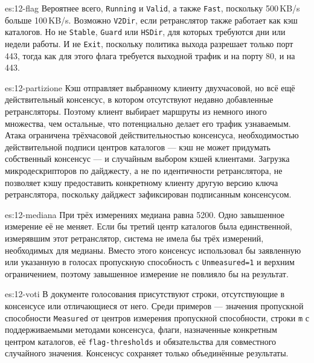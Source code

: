 \begin{soluzione}{es:12-flag}
Вероятнее всего, \texttt{Running} и \texttt{Valid}, а также \texttt{Fast}, поскольку 500\,KB/s больше 100\,KB/s. Возможно \texttt{V2Dir}, если ретранслятор также работает как кэш каталогов. Но не \texttt{Stable}, \texttt{Guard} или \texttt{HSDir}, для которых требуются дни или недели работы. И не \texttt{Exit}, поскольку политика выхода разрешает только порт 443, тогда как для этого флага требуется выходной трафик и на порту 80, и на 443.
\end{soluzione}

\begin{soluzione}{es:12-partizione}
Кэш отправляет выбранному клиенту двухчасовой, но всё ещё действительный консенсус, в котором отсутствуют недавно добавленные ретрансляторы. Поэтому клиент выбирает маршруты из немного иного множества, чем остальные, что потенциально делает его трафик узнаваемым. Атака ограничена трёхчасовой действительностью консенсуса, необходимостью действительной подписи центров каталогов — кэш не может придумать собственный консенсус — и случайным выбором кэшей клиентами. Загрузка микродескрипторов по дайджесту, а не по идентичности ретранслятора, не позволяет кэшу предоставить конкретному клиенту другую версию ключа ретранслятора, поскольку дайджест зафиксирован подписанным консенсусом.
\end{soluzione}

\begin{soluzione}{es:12-mediana}
При трёх измерениях медиана равна 5200. Одно завышенное измерение её не меняет. Если бы третий центр каталогов была единственной, измерявшим этот ретранслятор, система не имела бы трёх измерений, необходимых для медианы. Вместо этого консенсус использовал бы заявленную или указанную в голосах пропускную способность с \texttt{Unmeasured=1} и верхним ограничением, поэтому завышенное измерение не повлияло бы на результат.
\end{soluzione}

\begin{soluzione}{es:12-voti}
В документе голосования присутствуют строки, отсутствующие в консенсусе или отличающиеся от него. Среди примеров — значения пропускной способности \texttt{Measured} от центров измерения пропускной способности, строки \texttt{m} с поддерживаемыми методами консенсуса, флаги, назначенные конкретным центром каталогов, её \texttt{flag-thresholds} и обязательства для совместного случайного значения. Консенсус сохраняет только объединённые результаты.
\end{soluzione}

